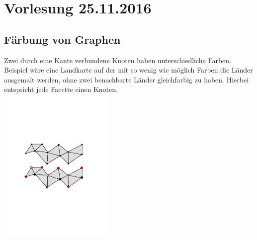 \section{Vorlesung 25.11.2016}
\subsection{Färbung von Graphen}
Zwei durch eine Kante verbundene Knoten haben unterschiedliche Farben.\\
Beispiel wäre eine Landkarte auf der mit so wenig wie möglich Farben die Länder ausgemalt werden, ohne zwei benachbarte Länder gleichfarbig zu haben. Hierbei entspricht jede Facette einen Knoten.\\
\includegraphics[width=0.4\textwidth]{lectures/161125/pix/Vertexfaerbung}
